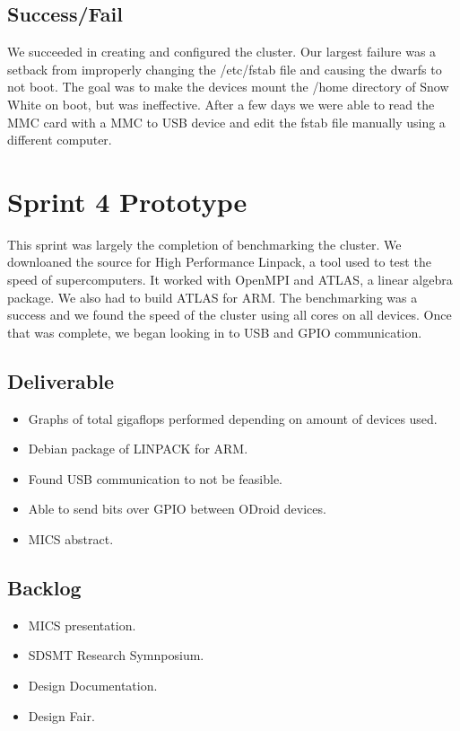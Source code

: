 \subsection{Success/Fail}

We succeeded in creating and configured the cluster. Our largest failure was a setback from improperly changing the /etc/fstab file and causing the dwarfs to not boot. The goal was to make the devices mount the /home directory of Snow White on boot, but was ineffective. After a few days we were able to read the MMC card with a MMC to USB device and edit the fstab file manually using a different computer.

\section{Sprint 4 Prototype}

This sprint was largely the completion of benchmarking the cluster. We downloaned the source for High Performance Linpack, a tool used to test the speed of supercomputers. It worked with OpenMPI and ATLAS, a linear algebra package. We also had to build ATLAS for ARM. The benchmarking was a success and we found the speed of the cluster using all cores on all devices. Once that was complete, we began looking in to USB and GPIO communication.

\subsection{Deliverable}

\begin{itemize}
\item Graphs of total gigaflops performed depending on amount of devices used.
\item Debian package of LINPACK for ARM.
\item Found USB communication to not be feasible.
\item Able to send bits over GPIO between ODroid devices.
\item MICS abstract.
\end {itemize}

\subsection{Backlog}

\begin{itemize}
\item MICS presentation.
\item SDSMT Research Symnposium.
\item Design Documentation.
\item Design Fair.
\end{itemize}

